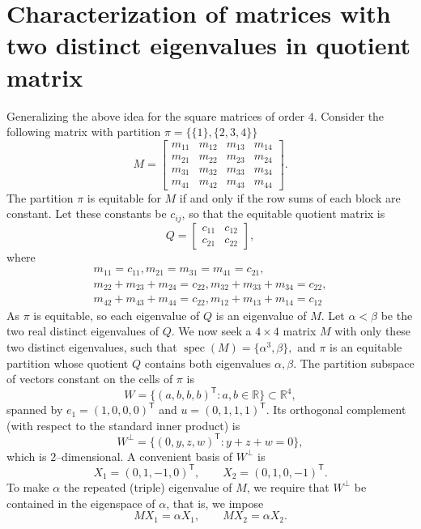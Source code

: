 \documentclass[12pt,twoside]{article}
\begin{document}
\section{Characterization of matrices with two distinct eigenvalues in quotient matrix}\label{section 3}
Generalizing the above idea for the square matrices of order $4$. Consider the following matrix with partition $\pi=\bigl\{\{1\},\{2,3,4\}\bigr\}$
	$$
	M=\left[ \begin{array}{c|ccc}
		m_{11} & m_{12} & m_{13} & m_{14}\\
		\hline
		m_{21} & m_{22} & m_{23} & m_{24}\\
		m_{31} & m_{32} & m_{33} & m_{34}\\
		m_{41} & m_{42} & m_{43} & m_{44}
	\end{array}\right].
	$$
 The partition $\pi$ is equitable for $M$ if and only if the row sums of each
	block are constant. Let these constants be $c_{ij}$, so that the equitable
	quotient matrix is
	\begin{equation}\label{eq:Q-4x4}
		Q=
		\begin{bmatrix}
			c_{11} & c_{12}\\
			c_{21} & c_{22}
		\end{bmatrix},
	\end{equation}
	where
	\begin{equation}\label{eq:system-1-4x4}
		\begin{aligned}
			m_{11}=c_{11}, m_{21}=m_{31}=m_{41}=c_{21},\\
				m_{22}+m_{23}+m_{24}=c_{22},m_{32}+m_{33}+m_{34}=c_{22},\\
				m_{42}+m_{43}+m_{44}=c_{22}, m_{12}+m_{13}+m_{14}=c_{12}
		\end{aligned}
	\end{equation}
	As $\pi$ is equitable, so each eigenvalue of $Q$ is an eigenvalue of $M$.	Let $\alpha<\beta$ be the two real distinct eigenvalues of $Q$. 	We now seek a $4\times 4$ matrix $M$ with only these two distinct
	eigenvalues, such that $\operatorname{spec}(M)=\{\alpha^{3},\beta\},$ 	and $\pi$ is an equitable partition whose quotient $Q$ contains both eigenvalues
	$\alpha,\beta$.  The partition subspace of vectors constant on the cells of $\pi$ is
	$$
	W=\{(a,b,b,b)^{\mathsf T}: a,b\in\mathbb{R}\}\subset\mathbb{R}^4,
	$$
	spanned by $e_1=(1,0,0,0)^{\mathsf T}$ and $u=(0,1,1,1)^{\mathsf T}$. Its
	orthogonal complement (with respect to the standard inner product) is
	$$
	W^\perp
	=
	\{(0,y,z,w)^{\mathsf T}: y+z+w=0\},
	$$
	which is $2$--dimensional. A convenient basis of $W^\perp$ is
	$$
	X_1=(0,1,-1,0)^{\mathsf T},\qquad
	X_2=(0,1,0,-1)^{\mathsf T}.
	$$
	To make $\alpha$ the repeated (triple) eigenvalue of $M$, we require that
	$W^\perp$ be contained in the eigenspace of $\alpha$, that is, we impose
	$$
	M X_1 = \alpha X_1,
	\qquad
	M X_2 = \alpha X_2.
	$$
	
\end{document}
